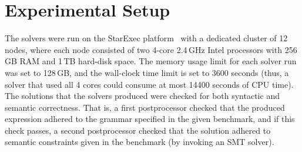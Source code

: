\section{Experimental Setup} 
\label{sec:exp-set}

The solvers were run on the StarExec platform~\cite{starexec} with a dedicated cluster of 12 nodes,
where each node consisted of two 4-core 2.4\,GHz Intel processors with 256\,GB RAM and 1\,TB hard-disk space.
The memory usage limit for each solver run was set to 128\,GB, and the wall-clock time limit is set to 3600 seconds
(thus, a solver that used all 4 cores could consume at most 14400 seconds of CPU time).
The solutions that the solvers produced were checked for both syntactic and semantic correctness.
That is, a first postprocessor checked that the produced expression adhered to the grammar specified in the given benchmark,
and if this check passes, a second postprocessor checked that the solution adhered to semantic constraints
given in the benchmark (by invoking an SMT solver).